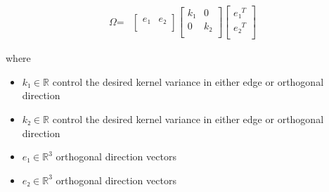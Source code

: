 \documentclass[12pt]{article}
\begin{document}
\begin{align*}
\textit{Ω} = & \begin{bmatrix}
\textit{e₁} & \textit{e₂}\\
\end{bmatrix}\begin{bmatrix}
\textit{k₁} & 0\\
0 & \textit{k₂}\\
\end{bmatrix}\begin{bmatrix}
\textit{e₁}^T\\
\textit{e₂}^T\\
\end{bmatrix}
\end{align*}

where
\begin{itemize}
\item $\textit{k₁} \in \mathbb{{R}}$ control the desired kernel variance in either edge or orthogonal direction
\item $\textit{k₂} \in \mathbb{{R}}$ control the desired kernel variance in either edge or orthogonal direction
\item $\textit{e₁} \in \mathbb{R}^{ 3}$ orthogonal direction vectors
\item $\textit{e₂} \in \mathbb{R}^{ 3}$ orthogonal direction vectors
\end{itemize}
\end{document}
